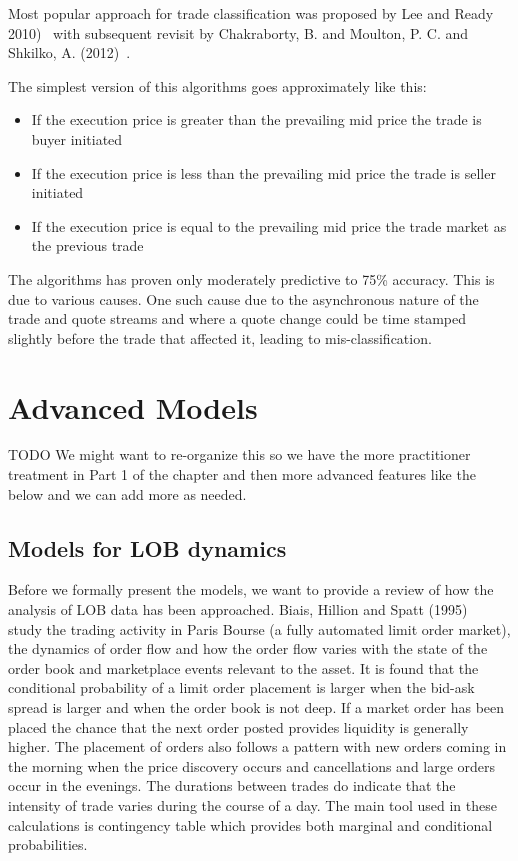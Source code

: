 Most popular approach for trade classification was proposed by Lee and Ready 2010)~\cite{leeready} with subsequent revisit by Chakraborty, B. and Moulton, P. C. and Shkilko, A. (2012)~\cite{chakrabarty2012short}.


The simplest version of this algorithms goes approximately like this:
\begin{itemize}
\item If the execution price is greater than the prevailing mid price the trade is buyer initiated
\item If the execution price is less than the prevailing mid price the trade is seller initiated
\item If the execution price is equal to the prevailing mid price the trade market as the previous trade
\end{itemize}

The algorithms has proven only moderately predictive to  75\% accuracy. This is due to various causes. One such cause due to the asynchronous nature of the trade and quote streams and where a quote change could be time stamped slightly before the trade that affected it, leading to mis-classification.


\section{Advanced Models}

TODO We might want to re-organize this so we have the more practitioner treatment in Part 1 of the chapter and then more advanced features like the below and we can add more as needed.

\subsection{Models for LOB dynamics}

Before we formally present the models, we want to provide a review of how the analysis of LOB data has been approached. Biais, Hillion and Spatt (1995)~\cite{spalt} study the trading activity in Paris Bourse (a fully automated limit order market), the dynamics of order flow and how the order flow varies with the state of the order book and marketplace events relevant to the asset. It is found that the conditional probability of a limit order placement is larger when the bid-ask spread is larger and when the order book is not deep. If a market order has been placed the chance that the next order posted provides liquidity is generally higher. The placement of orders also follows a pattern with new orders coming in the morning when the price discovery occurs and cancellations and large orders occur in the evenings. The durations between trades do indicate that the intensity of trade varies during the course of a day. The main tool used in these calculations is contingency table which provides both marginal and conditional probabilities. \\


